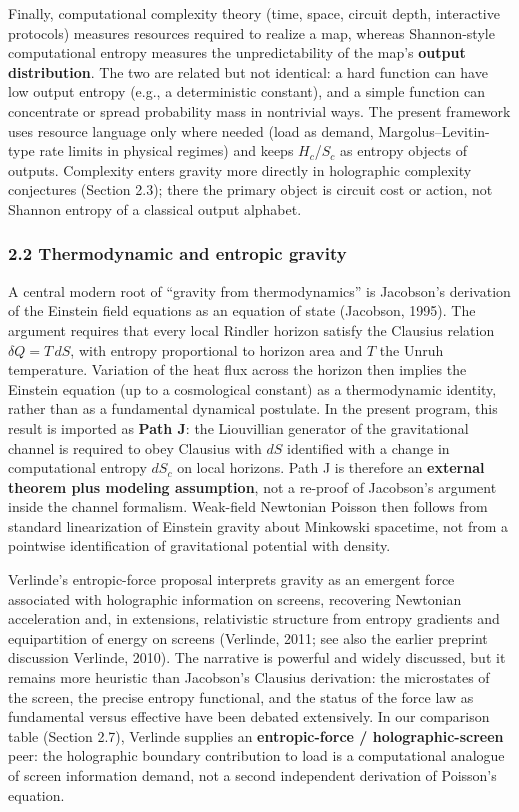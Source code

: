 \documentclass[
  11pt,
]{article}
\begin{document}
Finally, computational complexity theory (time, space, circuit depth,
interactive protocols) measures resources required to realize a map,
whereas Shannon-style computational entropy measures the
unpredictability of the map's \textbf{output distribution}. The two are
related but not identical: a hard function can have low output entropy
(e.g., a deterministic constant), and a simple function can concentrate
or spread probability mass in nontrivial ways. The present framework
uses resource language only where needed (load as demand,
Margolus--Levitin-type rate limits in physical regimes) and keeps
\(H_c\)/\(S_c\) as entropy objects of outputs. Complexity enters gravity
more directly in holographic complexity conjectures (Section 2.3); there
the primary object is circuit cost or action, not Shannon entropy of a
classical output alphabet.

\subsubsection{2.2 Thermodynamic and entropic
gravity}\label{thermodynamic-and-entropic-gravity}

A central modern root of ``gravity from thermodynamics'' is Jacobson's
derivation of the Einstein field equations as an equation of state
(Jacobson, 1995). The argument requires that every local Rindler horizon
satisfy the Clausius relation \(\delta Q = T\,dS\), with entropy
proportional to horizon area and \(T\) the Unruh temperature. Variation
of the heat flux across the horizon then implies the Einstein equation
(up to a cosmological constant) as a thermodynamic identity, rather than
as a fundamental dynamical postulate. In the present program, this
result is imported as \textbf{Path J}: the Liouvillian generator of the
gravitational channel is required to obey Clausius with \(dS\)
identified with a change in computational entropy \(dS_c\) on local
horizons. Path J is therefore an \textbf{external theorem plus modeling
assumption}, not a re-proof of Jacobson's argument inside the channel
formalism. Weak-field Newtonian Poisson then follows from standard
linearization of Einstein gravity about Minkowski spacetime, not from a
pointwise identification of gravitational potential with density.

Verlinde's entropic-force proposal interprets gravity as an emergent
force associated with holographic information on screens, recovering
Newtonian acceleration and, in extensions, relativistic structure from
entropy gradients and equipartition of energy on screens (Verlinde,
2011; see also the earlier preprint discussion Verlinde, 2010). The
narrative is powerful and widely discussed, but it remains more
heuristic than Jacobson's Clausius derivation: the microstates of the
screen, the precise entropy functional, and the status of the force law
as fundamental versus effective have been debated extensively. In our
comparison table (Section 2.7), Verlinde supplies an
\textbf{entropic-force / holographic-screen} peer: the holographic
boundary contribution to load is a computational analogue of screen
information demand, not a second independent derivation of Poisson's
equation.
\end{document}
